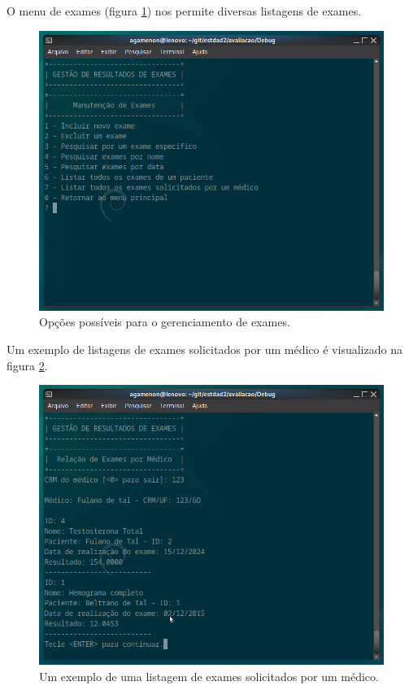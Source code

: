 \documentclass[a4paper,12pt,article]{abntex2}
\begin{document}
      O menu de exames (figura \ref{menuexames}) nos permite diversas listagens de exames.

      \begin{figure}[h]
        \centering
        \includegraphics[scale=0.25]{./fig/menuexames}
        \caption{Opções possíveis para o gerenciamento de exames.}
        \label{menuexames}
      \end{figure}

      Um exemplo de listagens de exames solicitados por um médico é visualizado na figura \ref{relacaoexames}.

      \begin{figure}[h]
        \centering
        \includegraphics[scale=0.25]{./fig/listaexames}
        \caption{Um exemplo de uma listagem de exames solicitados por um médico.}
        \label{relacaoexames}
      \end{figure}
\end{document}
